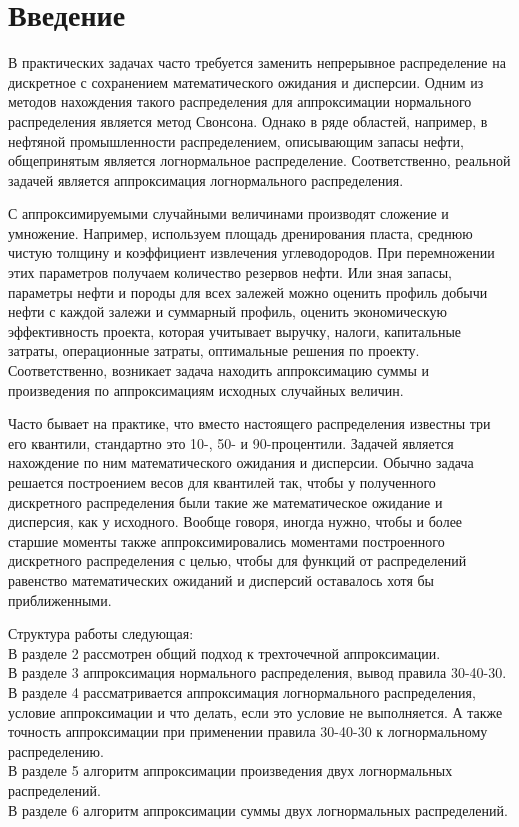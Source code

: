 \documentclass[12pt]{article}
\begin{document}
	
	
	
	\tableofcontents
	\pagebreak
	
	\section{Введение}
	
	В практических задачах часто требуется заменить непрерывное распределение на
	дискретное с сохранением математического ожидания и дисперсии. Одним из методов
	нахождения такого распределения для аппроксимации нормального распределения является метод Свонсона. Однако в ряде областей, например, в нефтяной промышленности распределением, описывающим запасы нефти, общепринятым является логнормальное распределение. Соответственно, реальной задачей является аппроксимация логнормального распределения.
	
	С аппроксимируемыми случайными величинами производят сложение и умножение.
	Например, используем площадь дренирования пласта, среднюю чистую толщину и коэффициент извлечения углеводородов. При перемножении этих параметров получаем количество резервов нефти. Или зная запасы, параметры нефти и породы для всех залежей можно оценить профиль добычи нефти  с каждой залежи и суммарный профиль, оценить экономическую эффективность проекта, которая учитывает выручку, налоги, капитальные затраты, операционные затраты, оптимальные решения по проекту.
	Соответственно, возникает задача находить аппроксимацию суммы и произведения по аппроксимациям исходных случайных величин.
	
	Часто бывает на практике, что вместо настоящего распределения известны три его квантили, стандартно это 10-, 50- и 90-процентили. Задачей является нахождение по ним математического ожидания и дисперсии. Обычно задача решается построением весов для квантилей так, чтобы у полученного дискретного распределения были такие же математическое ожидание и дисперсия, как у исходного. Вообще говоря, иногда нужно, чтобы и более старшие моменты также аппроксимировались моментами построенного дискретного распределения с целью, чтобы для функций от распределений равенство математических ожиданий и дисперсий оставалось хотя бы приближенными.
	
Структура работы следующая:\\
	В разделе 2 рассмотрен общий подход к трехточечной аппроксимации.\\
	В разделе 3 аппроксимация нормального распределения, вывод правила 30-40-30.\\
	В разделе 4 рассматривается аппроксимация логнормального распределения, условие аппроксимации и что делать, если это условие не выполняется. А также точность аппроксимации при применении правила 30-40-30 к логнормальному распределению.\\
	В разделе 5 алгоритм аппроксимации произведения двух логнормальных распределений.\\
	В разделе 6 алгоритм аппроксимации суммы двух логнормальных распределений.
	
\end{document}
